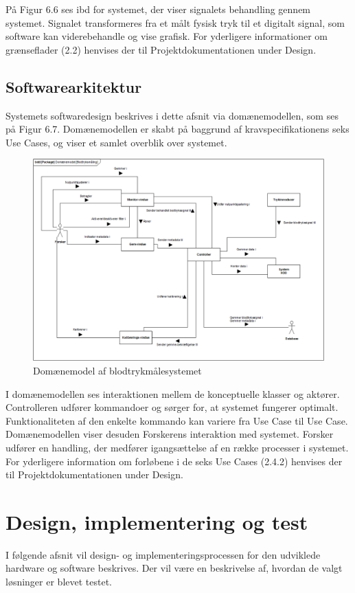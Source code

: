 På Figur 6.6 ses ibd for systemet, der viser signalets behandling gennem systemet. Signalet transformeres fra et målt fysisk tryk til et digitalt signal, som software kan viderebehandle og vise grafisk. For yderligere informationer om grænseflader (2.2) henvises der til Projektdokumentationen under Design.

 
\subsection{Softwarearkitektur}
Systemets softwaredesign beskrives i dette afsnit via domænemodellen, som ses på Figur 6.7. Domænemodellen er skabt på baggrund af kravspecifikationens seks Use Cases, og viser et samlet overblik over systemet. 
\begin{figure}[H]
	\centering
	\includegraphics[width=1\textwidth]{Figurer/dm}
	\caption{Domænemodel af blodtrykmålesystemet}
\end{figure}
I domænemodellen ses interaktionen mellem de konceptuelle klasser og aktører. Controlleren udfører kommandoer og sørger for, at systemet fungerer optimalt. Funktionaliteten af den enkelte kommando kan variere fra Use Case til Use Case. Domænemodellen viser desuden Forskerens interaktion med systemet. Forsker udfører en handling, der medfører igangsættelse af en række processer i systemet. 
For yderligere information om forløbene i de seks Use Cases (2.4.2) henvises der til Projektdokumentationen under Design. 


\section{Design, implementering og test}
I følgende afsnit vil design- og implementeringsprocessen for den udviklede hardware og software beskrives. Der vil være en beskrivelse af, hvordan de valgt løsninger er blevet testet. 

